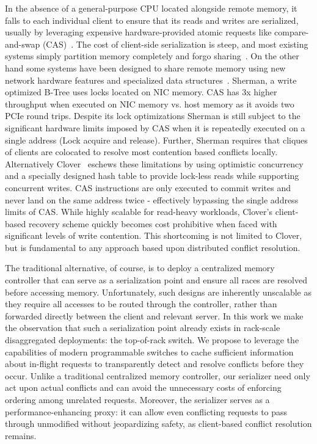 In the absence of a general-purpose CPU located alongside remote memory, it
falls to each individual client to ensure that its reads and writes are
serialized, usually by leveraging expensive hardware-provided atomic requests
like compare-and-swap (CAS)~\cite{design-guidelines}. The cost of client-side
serialization is steep, and most existing systems simply partition memory
completely and forgo sharing~\cite{reigons,fastswap, legoos}.  
On the other hand some systems have been designed to share remote memory using
new network hardware features and specialized data
structures~\cite{clover,sherman}. Sherman, a write optimized B-Tree uses locks
located on NIC memory. CAS has 3x higher throughput when executed on NIC memory
vs. host memory as it avoids two PCIe round trips.
Despite its lock optimizations Sherman is still subject to the significant
hardware limits imposed by CAS when it is repeatedly executed on a single
address (Lock acquire and release). Further, Sherman requires that cliques of
clients are colocated to resolve most contention based conflicts locally.
Alternatively Clover~\cite{clover} eschews these limitations by using optimistic
concurrency and a specially designed hash table to provide lock-less reads while
supporting concurrent writes. CAS instructions are only executed to commit
writes and never land on the same address twice - effectively bypassing the
single address limits of CAS.
While highly scalable for read-heavy workloads, Clover's client-based recovery
scheme quickly becomes cost prohibitive when faced with significant levels of
write contention. This shortcoming is not limited to Clover, but is fundamental
to any approach based upon distributed conflict resolution.


The traditional alternative, of course, is to deploy a centralized
memory controller that can serve as a serialization point and ensure
all races are resolved before accessing memory.  Unfortunately, such
designs are inherently unscalable as they require all accesses to be
routed through the controller, rather than forwarded directly between
the client and relevant server.  In this work we make the observation
that such a serialization point already exists in rack-scale
disaggregated deployments: the top-of-rack switch.  We propose to
leverage the capabilities of modern programmable switches to cache
sufficient information about in-flight requests to transparently
detect and resolve conflicts before they occur.  Unlike a traditional
centralized memory controller, our serializer need only act upon
actual conflicts and can avoid the unnecessary costs of enforcing
ordering among unrelated requests.  Moreover, the
serializer serves as a performance-enhancing proxy: it can 
allow even conflicting requests to pass through unmodified without
jeopardizing safety, as client-based conflict resolution remains.

